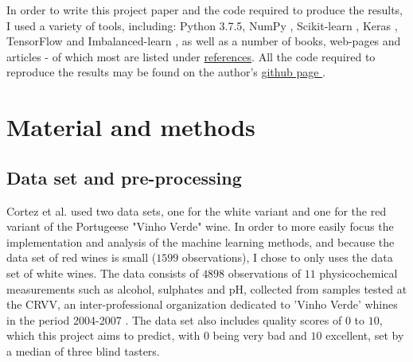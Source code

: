 \documentclass[%
oneside,                 %
final,                   %
10pt]{article}
\begin{document}
In order to write this project paper and the code required to produce the results, I used a variety of tools, including: Python 3.7.5, NumPy \cite{numpy}, Scikit-learn \cite{sklearn}, Keras \cite{keras}, TensorFlow \cite{tensorflow} and Imbalanced-learn \cite{imblearn}, as well as a number of books, web-pages and articles - of which most are listed under 
 \hyperref[refer]{references}. All the code required to reproduce the results may be found on the author's \href{https://github.com/johanere/FYS-STK4155/tree/master/Project3}{github page }.  



\section{Material and methods} \label{Section_Theory}
\subsection{Data set and pre-processing} \label{data_pp}
Cortez et al. \citep{CortezPaulo} used two data sets, one for the white variant and one for the red variant of the Portugeese "Vinho Verde" wine. In order to more easily focus the implementation and analysis of the machine learning methods, and because the data set of red wines is small ($1599$ observations), I chose to only uses the data set of white wines. The data consists of $4898$ observations of $11$ physicochemical measurements such as alcohol, sulphates and pH, collected from samples tested at the CRVV, an inter-professional organization dedicated to 'Vinho Verde' whines in the period 2004-2007 \citep{CortezPaulo}. The data set also includes quality scores of $0$ to $10$, which this project aims to predict, with $0$ being very bad and $10$ excellent, set by a median of three blind tasters. 
\end{document}
